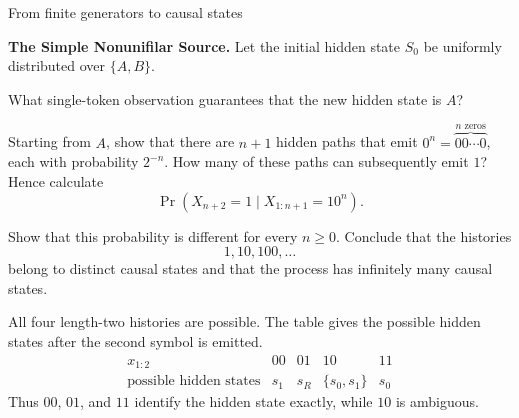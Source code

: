 \begin{exercise}[Extension]{From finite generators to causal states}
\begin{parts}
    \item \textbf{The Simple Nonunifilar Source.}
      Let the initial hidden state $S_0$ be uniformly distributed over $\{A,B\}$.
      \par\nobreak
      {\centering
        \par}

      \begin{subparts}
        \item What single-token observation guarantees that the new hidden
          state is $A$?

        \item Starting from $A$, show that there are $n+1$ hidden paths that
          emit \(0^n = \overbrace{00\cdots0}^{n\text{ zeros}}\), each with
          probability $2^{-n}$. How many of these paths
          can subsequently emit $1$? Hence calculate
          \[
            \Pr(X_{n+2}=1\mid X_{1:n+1}=10^n).
          \]

        \item Show that this probability is different for every $n\geq0$.
          Conclude that the histories
          \[
            1,10,100,\ldots
          \]
          belong to distinct causal states and that the process has infinitely
          many causal states.
      \end{subparts}
  \end{parts}

  \begin{solution}
    \begin{parts}
      \item
        \begin{subparts}
          \item All four length-two histories are possible. The table gives
            the possible hidden states after the second symbol is emitted.
            \[
              \begin{array}{c|cccc}
                x_{1:2} & 00 & 01 & 10 & 11\\
                \hline
                \text{possible hidden states} & s_1 & s_R & \{s_0,s_1\} & s_0
              \end{array}
            \]
            Thus $00$, $01$, and $11$ identify the hidden state exactly, while $10$
            is ambiguous.


\end{subparts}
\end{parts}
\end{solution}
\end{exercise}
